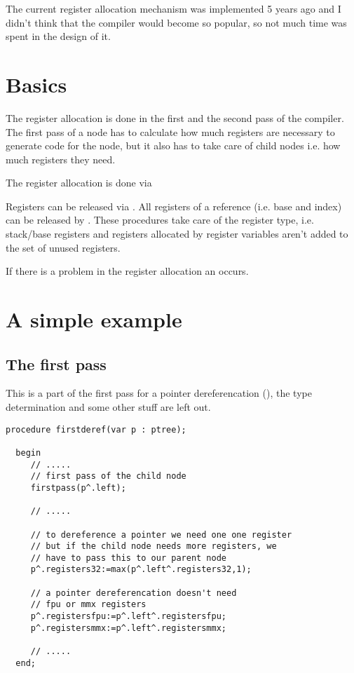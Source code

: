 The current register allocation mechanism was implemented 5 years
ago and I didn't think that the compiler would become
so popular, so not much time was spent in the design of it.

\section{Basics}

The register allocation is done in the first and the second pass of
the compiler.
The first pass of a node has to calculate how much registers
are necessary to generate code for the node, but it also has
to take care of child nodes i.e. how much registers
they need.

The register allocation is done via 

Registers can be released via . All registers
of a reference (i.e. base and index) can be released by
. These procedures take care of the register type,
i.e. stack/base registers and registers allocated by register
variables aren't added to the set of unused registers.

If there is a problem in the register allocation an 
occurs.

\section{A simple example}

\subsection{The first pass}

This is a part of the first pass for a pointer dereferencation
(), the type determination and some other stuff are left out.

\begin{verbatim}
procedure firstderef(var p : ptree);

  begin
     // .....
     // first pass of the child node
     firstpass(p^.left);

     // .....

     // to dereference a pointer we need one one register
     // but if the child node needs more registers, we
     // have to pass this to our parent node
     p^.registers32:=max(p^.left^.registers32,1);

     // a pointer dereferencation doesn't need
     // fpu or mmx registers
     p^.registersfpu:=p^.left^.registersfpu;
     p^.registersmmx:=p^.left^.registersmmx;

     // .....
  end;
\end{verbatim}


